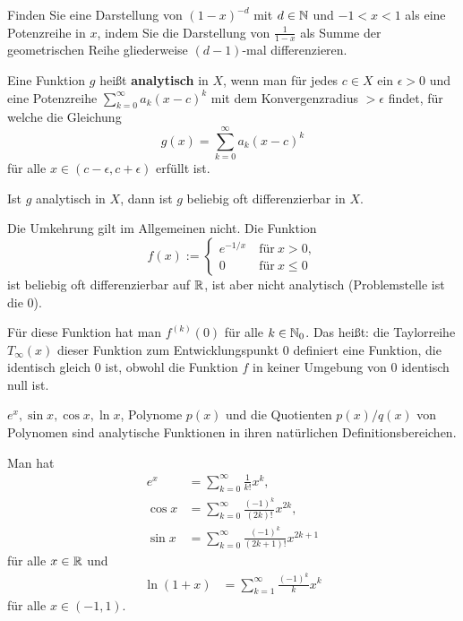 \begin{aufg} 
	Finden Sie eine Darstellung von $(1-x)^{-d}$ mit $d \in \mathbb{N}$ und $-1 < x < 1$ als eine Potenzreihe in $x$, indem Sie die Darstellung von $\frac{1}{1-x}$ als Summe der geometrischen Reihe gliederweise $(d-1)$-mal differenzieren. 
\end{aufg} 

\begin{defn} 
	Eine Funktion $g$ heißt \textbf{analytisch} in $X$, wenn man für jedes $c \in X$ ein $\epsilon>0$ und eine Potenzreihe $\sum_{k=0}^\infty a_k (x-c)^k$ mit dem Konvergenzradius $> \epsilon$ findet, für welche die Gleichung
	\[	
			g(x) = \sum_{k=0}^\infty a_k (x-c)^k 
	\]
	für alle $x \in (c-\epsilon, c+ \epsilon)$ erfüllt ist. 
\end{defn} 

\begin{thm} 
	Ist $g$ analytisch in $X$, dann ist $g$ beliebig oft differenzierbar in $X$. 
\end{thm} 

\begin{bem} 
	Die Umkehrung gilt im Allgemeinen nicht. Die Funktion
	\[
		f(x) := \begin{cases} 
			e^{-1/x} & \ \text{für} \ x >0,
			\\ 0 & \ \text{für}  \ x \le 0
		\end{cases} 
	\]
	ist beliebig oft differenzierbar auf $\mathbb{R}$, ist aber nicht analytisch (Problemstelle ist die $0$). 
	
	Für diese Funktion hat man $f^{(k)}(0)$ für alle $k \in \mathbb{N}_0$. Das heißt: die Taylorreihe $T_\infty(x)$ dieser Funktion zum Entwicklungspunkt $0$ definiert eine Funktion, die identisch gleich $0$ ist, obwohl die Funktion $f$ in keiner Umgebung von $0$ identisch null ist. 
\end{bem} 

\begin{thm}
	$e^x, \sin x, \cos x, \ln x$, Polynome $p(x)$ und die Quotienten $p(x)/q(x)$ von Polynomen sind analytische Funktionen in ihren natürlichen Definitionsbereichen. 
\end{thm}

\begin{thm} 
	Man hat 
	\begin{align*}
		e^x & = \sum_{k=0}^\infty \frac{1}{k!} x^k,
		\\ \cos x & = \sum_{k=0}^\infty \frac{(-1)^k}{(2k)!} x^{2k},
		\\ \sin x & = \sum_{k=0}^\infty \frac{(-1)^k}{ (2k +1)!} x^{2k+1}
	\end{align*} 
	für alle $x \in \mathbb{R}$ und 
	\begin{align*}
		\ln (1+x) & = \sum_{k=1}^\infty \frac{(-1)^k}{k} x^k
	\end{align*}
	für alle $x \in (-1,1)$. 
\end{thm} 

